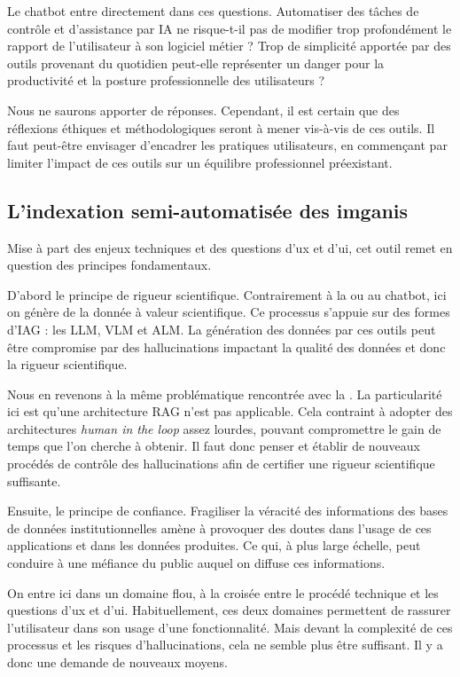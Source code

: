 Le \gls{chatbot} entre directement dans ces questions. Automatiser des tâches de contrôle et d'assistance par \gls{IA} ne risque-t-il pas de modifier trop profondément le rapport de l'utilisateur à son logiciel métier ? Trop de simplicité apportée par des outils provenant du quotidien peut-elle représenter un danger pour la productivité et la posture professionnelle des utilisateurs ? 

Nous ne saurons apporter de réponses. Cependant, il est certain que des réflexions éthiques et méthodologiques seront à mener vis-à-vis de ces outils. Il faut peut-être envisager d'encadrer les pratiques utilisateurs, en commençant par limiter l'impact de ces outils sur un équilibre professionnel préexistant.

\subsection{L'indexation semi-automatisée des \glspl{imgani}}

Mise à part des enjeux techniques et des questions d'\gls{ux} et d'\gls{ui}, cet outil remet en question des principes fondamentaux.\newline

D'abord le principe de rigueur scientifique. Contrairement à la  ou au \gls{chatbot}, ici on génère de la donnée à valeur scientifique. Ce processus s’appuie sur des formes d'\gls{IAG} : les \gls{LLM}, \gls{VLM} et \gls{ALM}. La génération des données par ces outils peut être compromise par des hallucinations impactant la qualité des données et donc la rigueur scientifique.

Nous en revenons à la même problématique rencontrée avec la . La particularité ici est qu'une architecture \gls{RAG} n'est pas applicable. Cela contraint à adopter des architectures \textit{human in the loop} assez lourdes, pouvant compromettre le gain de temps que l'on cherche à obtenir. Il faut donc penser et établir de nouveaux procédés de contrôle des hallucinations afin de certifier une rigueur scientifique suffisante.

Ensuite, le principe de confiance. Fragiliser la véracité des informations des bases de données institutionnelles amène à provoquer des doutes dans l'usage de ces applications et dans les données produites. Ce qui, à plus large échelle, peut conduire à une méfiance du public auquel on diffuse ces informations.

On entre ici dans un domaine flou, à la croisée entre le procédé technique et les questions d'\gls{ux} et d'\gls{ui}. Habituellement, ces deux domaines permettent de rassurer l'utilisateur dans son usage d'une fonctionnalité. Mais devant la complexité de ces processus et les risques d'hallucinations, cela ne semble plus être suffisant. Il y a donc une demande de nouveaux moyens.\newline


